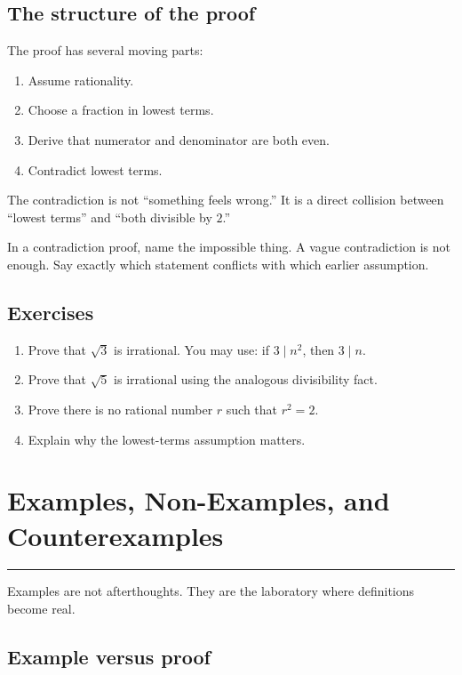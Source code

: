 \documentclass[12pt]{article}
\newcommand{\chapterline}{\vspace{0.4em}\hrule\vspace{0.8em}}
\begin{document}
\subsection{The structure of the proof}

The proof has several moving parts:

\begin{enumerate}
\item Assume rationality.
\item Choose a fraction in lowest terms.
\item Derive that numerator and denominator are both even.
\item Contradict lowest terms.
\end{enumerate}

The contradiction is not ``something feels wrong.'' It is a direct collision between ``lowest terms'' and ``both divisible by $2$.''

\begin{trapbox}
In a contradiction proof, name the impossible thing. A vague contradiction is not enough. Say exactly which statement conflicts with which earlier assumption.
\end{trapbox}

\subsection{Exercises}

\begin{enumerate}
\item Prove that $\sqrt3$ is irrational. You may use: if $3\mid n^2$, then $3\mid n$.
\item Prove that $\sqrt5$ is irrational using the analogous divisibility fact.
\item Prove there is no rational number $r$ such that $r^2=2$.
\item Explain why the lowest-terms assumption matters.
\end{enumerate}

\newpage
\section{Examples, Non-Examples, and Counterexamples}
\chapterline

Examples are not afterthoughts. They are the laboratory where definitions become real.

\subsection{Example versus proof}
\end{document}
